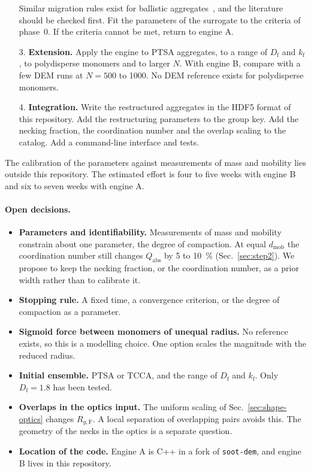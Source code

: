 \documentclass[11pt,a4paper]{article}
\newcommand{\Df}{D_\text{f}}
\begin{document}
\begin{enumerate}
        Similar migration rules exist for ballistic aggregates~\cite{shen2008}, and the literature should be checked first.
        Fit the parameters of the surrogate to the criteria of phase~0.
        If the criteria cannot be met, return to engine A.
  \item[3.] \textbf{Extension.}
        Apply the engine to PTSA aggregates, to a range of $\Df$ and $k_\text{f}$, to polydisperse monomers and to larger $N$.
        With engine B, compare with a few DEM runs at $N = 500$ to 1000.
        No DEM reference exists for polydisperse monomers.
  \item[4.] \textbf{Integration.}
        Write the restructured aggregates in the HDF5 format of this repository.
        Add the restructuring parameters to the group key.
        Add the necking fraction, the coordination number and the overlap scaling to the catalog.
        Add a command-line interface and tests.
\end{enumerate}

The calibration of the parameters against measurements of mass and mobility lies outside this repository.
The estimated effort is four to five weeks with engine B and six to seven weeks with engine A.

\paragraph{Open decisions.}
\begin{itemize}
  \item \textbf{Parameters and identifiability.}
        Measurements of mass and mobility constrain about one parameter, the degree of compaction.
        At equal $d_\text{mob}$ the coordination number still changes $Q_\text{abs}$ by 5 to \SI{10}{\percent} (Sec.~\ref{sec:step2}).
        We propose to keep the necking fraction, or the coordination number, as a prior width rather than to calibrate it.
  \item \textbf{Stopping rule.}
        A fixed time, a convergence criterion, or the degree of compaction as a parameter.
  \item \textbf{Sigmoid force between monomers of unequal radius.}
        No reference exists, so this is a modelling choice.
        One option scales the magnitude with the reduced radius.
  \item \textbf{Initial ensemble.}
        PTSA or TCCA, and the range of $\Df$ and $k_\text{f}$.
        Only $\Df = 1.8$ has been tested.
  \item \textbf{Overlaps in the optics input.}
        The uniform scaling of Sec.~\ref{sec:shape-optics} changes $R_{g,\text{F}}$.
        A local separation of overlapping pairs avoids this.
        The geometry of the necks in the optics is a separate question.
  \item \textbf{Location of the code.}
        Engine A is C++ in a fork of \texttt{soot-dem}, and engine B lives in this repository.
\end{itemize}
\end{document}
